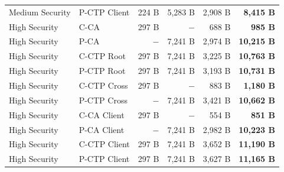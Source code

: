 \begin{table}[htbp]
\begin{tabular}{llrrrr}
  Medium Security & P-CTP Client & 224 B & 5,283 B & 2,908 B & \textbf{8,415 B} \\
  High Security & C-CA & 297 B & $-$ & 688 B & \textbf{985 B} \\
  High Security & P-CA & $-$ & 7,241 B & 2,974 B & \textbf{10,215 B} \\
  High Security & C-CTP Root & 297 B & 7,241 B & 3,225 B & \textbf{10,763 B} \\
  High Security & P-CTP Root & 297 B & 7,241 B & 3,193 B & \textbf{10,731 B} \\
  High Security & C-CTP Cross & 297 B & $-$ & 883 B & \textbf{1,180 B} \\
  High Security & P-CTP Cross & $-$ & 7,241 B & 3,421 B & \textbf{10,662 B} \\
  High Security & C-CA Client & 297 B & $-$ & 554 B & \textbf{851 B} \\
  High Security & P-CA Client & $-$ & 7,241 B & 2,982 B & \textbf{10,223 B} \\
  High Security & C-CTP Client & 297 B & 7,241 B & 3,652 B & \textbf{11,190 B} \\
  High Security & P-CTP Client & 297 B & 7,241 B & 3,627 B & \textbf{11,165 B} \\
    \bottomrule
  \end{tabular}
\end{table}
